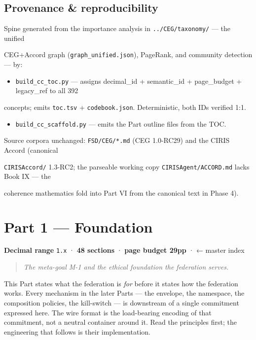 \documentclass[11pt]{article}
\begin{document}
\subsection*{Provenance \& reproducibility}


Spine generated from the importance analysis in \texttt{../CEG/taxonomy/} — the unified

CEG+Accord graph (\texttt{graph\_unified.json}), PageRank, and community detection — by:


\begin{itemize}\setlength\itemsep{0pt}
\item \texttt{build\_cc\_toc.py} — assigns decimal\_id + semantic\_id + page\_budget + legacy\_ref to all 392
\end{itemize}

  concepts; emits \texttt{toc.tsv} + \texttt{codebook.json}. Deterministic, both IDs verified 1:1.

\begin{itemize}\setlength\itemsep{0pt}
\item \texttt{build\_cc\_scaffold.py} — emits the Part outline files from the TOC.
\end{itemize}


Source corpora unchanged: \texttt{FSD/CEG/*.md} (CEG 1.0-RC29) and the CIRIS Accord (canonical

\texttt{CIRISAccord/} 1.3-RC2; the parseable working copy \texttt{CIRISAgent/ACCORD.md} lacks Book IX — the

coherence mathematics fold into Part VI from the canonical text in Phase 4).


\clearpage
\section*{Part 1 — Foundation}


\textbf{Decimal range} \texttt{1.x} · \textbf{48 sections} · \textbf{page budget 29pp} · ← master index


\begin{quote}\itshape The meta-goal M-1 and the ethical foundation the federation serves.\end{quote}



This Part states what the federation is \textit{for} before it states how the federation works. Every mechanism in the later Parts — the envelope, the namespace, the composition policies, the kill-switch — is downstream of a single commitment expressed here. The wire format is the load-bearing encoding of that commitment, not a neutral container around it. Read the principles first; the engineering that follows is their implementation.
\end{document}
